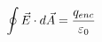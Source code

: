 \documentclass[preview]{standalone}
\begin{document}
\begin{align*}
\special{dvisvgm:raw <g id='unique000'>}\oint \vec{E} \cdot d\vec{A} = \frac{q_{enc}}{\varepsilon_0}\special{dvisvgm:raw </g>}
\end{align*}
\end{document}
